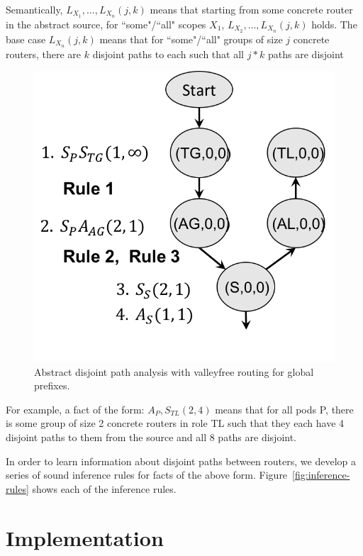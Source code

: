 \documentclass{sig-alternate-10pt}
\begin{document}
Semantically, $L_{X_1}, \ldots, L_{X_n}(j,k)$ means that starting from some concrete router in the abstract source, for ``some"/``all" scopes $X_1$, $L_{X_2}, \ldots, L_{X_n}(j,k)$ holds. The base case $L_{X_n}(j,k)$ means that for ``some"/``all" groups of size $j$ concrete routers, there are $k$ disjoint paths to each such that all $j*k$ paths are disjoint

\begin{figure}
  \begin{center}
    \includegraphics[width=.66\columnwidth]{figures/analysis}
  \end{center}
  \caption{Abstract disjoint path analysis with valleyfree routing for global prefixes. \label{fig:compilation-times}}
  \vspace{-1em}
\end{figure}

For example, a fact of the form: $A_P, S_{TL}(2,4)$ means that for all pods P, there is some group of size 2 concrete routers in role TL such that they each have 4 disjoint paths to them from the source and all 8 paths are disjoint.

In order to learn information about disjoint paths between routers, we develop a series of sound inference rules for facts of the above form. Figure~\ref{fig:inference-rules} shows each of the inference rules.


%
%
%
%


\section{Implementation}
\label{sec:implementation}
\end{document}
